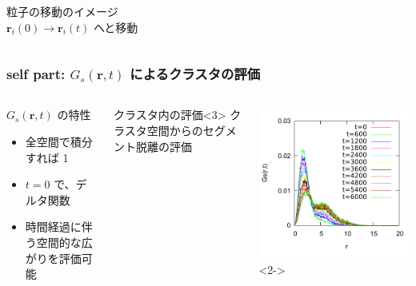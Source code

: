 \documentclass[12pt, dvipdfmx]{beamer}
\begin{document}
\begin{frame}
\begin{columns}[T, totalwidth=\linewidth]
\centering
粒子の移動のイメージ\\
$\bm{r}_i(0) \rightarrow \bm{r}_i(t)$ へと移動

\end{columns}
\end{frame}

\begin{frame}
\frametitle{self part: $G_s(\bm{r}, t)$ によるクラスタの評価}

\begin{columns}[T, totalwidth=0.96\linewidth]

\begin{block}{$G_s(\bm{r}, t)$ の特性}
	\begin{itemize}
	\item
	全空間で積分すれば 1\\
	\item
	$t=0$ で、デルタ関数
	\item
	時間経過に伴う空間的な広がりを評価可能
	\end{itemize}
\end{block}

\begin{alertblock}{クラスタ内の評価}<3>
クラスタ空間からのセグメント脱離の評価
\end{alertblock}

\includegraphics[width=\columnwidth]{./fig/Ave_Trj.pdf}<2->


\end{columns}
\end{frame}
\end{document}
